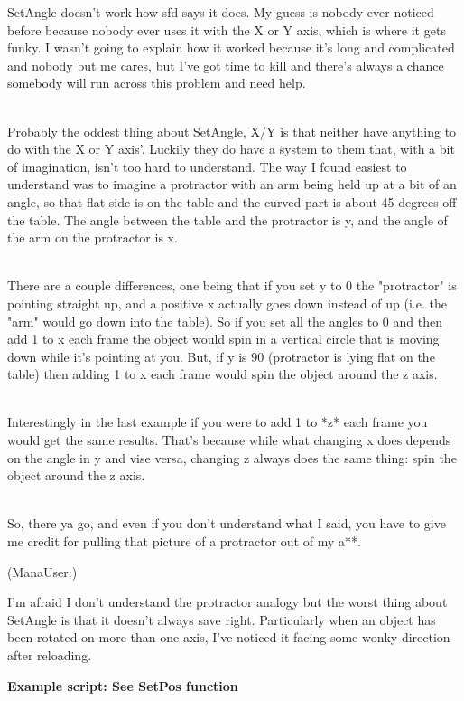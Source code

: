 \documentclass[
]{article}
\begin{document}
SetAngle doesn't work how sfd says it does. My guess is nobody ever
noticed before because nobody ever uses it with the X or Y axis, which
is where it gets funky. I wasn't going to explain how it worked because
it's long and complicated and nobody but me cares, but I've got time to
kill and there's always a chance somebody will run across this problem
and need help.\\
\strut \\
Probably the oddest thing about SetAngle, X/Y is that neither have
anything to do with the X or Y axis'. Luckily they do have a system to
them that, with a bit of imagination, isn't too hard to understand. The
way I found easiest to understand was to imagine a protractor with an
arm being held up at a bit of an angle, so that flat side is on the
table and the curved part is about 45 degrees off the table. The angle
between the table and the protractor is y, and the angle of the arm on
the protractor is x.\\
\strut \\
There are a couple differences, one being that if you set y to 0 the
"protractor" is pointing straight up, and a positive x actually goes
down instead of up (i.e. the "arm" would go down into the table). So if
you set all the angles to 0 and then add 1 to x each frame the object
would spin in a vertical circle that is moving down while it's pointing
at you. But, if y is 90 (protractor is lying flat on the table) then
adding 1 to x each frame would spin the object around the z axis.\\
\strut \\
Interestingly in the last example if you were to add 1 to *z* each frame
you would get the same results. That's because while what changing x
does depends on the angle in y and vise versa, changing z always does
the same thing: spin the object around the z axis.\\
\strut \\
So, there ya go, and even if you don't understand what I said, you have
to give me credit for pulling that picture of a protractor out of my
a**.

(ManaUser:)

I'm afraid I don't understand the protractor analogy but the worst thing
about SetAngle is that it doesn't always save right. Particularly when
an object has been rotated on more than one axis, I've noticed it facing
some wonky direction after reloading.

\textbf{Example script: See SetPos function}
\end{document}
